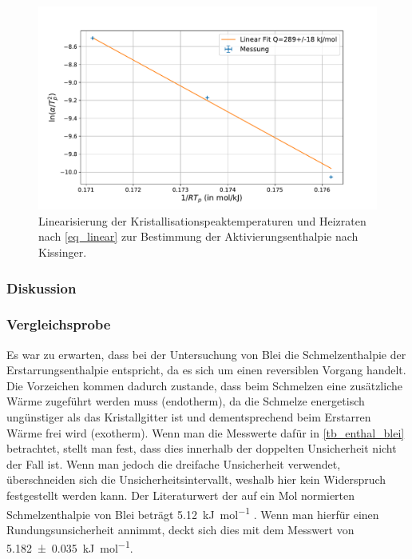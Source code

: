 \documentclass[
	a4paper,
	12pt,
	pagesize,
	ngerman
]{scrartcl}
\begin{document}
		\begin{figure}[H]
			\includegraphics[width=\linewidth]{img/Kalorimetrie_kissinger.pdf}
			\caption{
			Linearisierung der Kristallisationspeaktemperaturen und Heizraten nach \cref{eq_linear} zur Bestimmung der Aktivierungsenthalpie nach Kissinger.
			}
			\label{fig_thermo_kissinger}
		\end{figure}


	\subsubsection{Diskussion}

	\subsubsection*{Vergleichsprobe}
	Es war zu erwarten, dass bei der Untersuchung von Blei die Schmelzenthalpie der Erstarrungsenthalpie entspricht, da es sich um einen reversiblen Vorgang handelt.
	Die Vorzeichen kommen dadurch zustande, dass beim Schmelzen eine zusätzliche Wärme zugeführt werden muss (endotherm), da die Schmelze energetisch ungünstiger als das Kristallgitter ist und dementsprechend beim Erstarren Wärme frei wird (exotherm).
	Wenn man die Messwerte dafür in \cref{tb_enthal_blei} betrachtet, stellt man fest, dass dies innerhalb der doppelten Unsicherheit nicht der Fall ist.
	Wenn man jedoch die dreifache Unsicherheit verwendet, überschneiden sich die Unsicherheitsintervallt, weshalb hier kein Widerspruch festgestellt werden kann.
	Der Literaturwert der auf ein Mol normierten Schmelzenthalpie von Blei beträgt \SI{5.12}{\kilo \joule \per \mol} \cite{blei_enthalpie}.
	Wenn man hierfür einen Rundungsunsicherheit annimmt, deckt sich dies mit dem Messwert von \SI{5,182 \pm 0,035}{\kilo \joule \per \mol}. %
\end{document}
